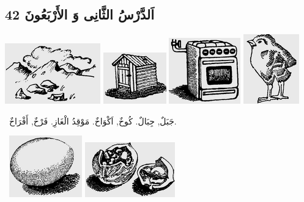 \documentclass[a5paper]{article}
\begin{document}
\subsection{اَلدَّرْسُ الثَّانِى وَ الأَرْبَعُونَ 42}
 \includegraphics[width=1.6252in,height=1.0311in]{MuhammadBagauddinlatinized-img125.png}   \includegraphics[width=1.0728in,height=0.8752in]{MuhammadBagauddinlatinized-img126.png}   \includegraphics[width=1.2189in,height=1.1252in]{MuhammadBagauddinlatinized-img127.png}   \includegraphics[width=0.948in,height=1.1874in]{MuhammadBagauddinlatinized-img128.png} 

\ جَبَلٌ, جِبَالٌ. كُوخٌ, اَكْوَاخٌ. مَوْقِدُ الْغَازِ. فَرْخٌ, أَفْرَاخٌ. 

\  \includegraphics[width=1.2398in,height=1.052in]{MuhammadBagauddinlatinized-img129.png}   \includegraphics[width=1.5311in,height=0.9374in]{MuhammadBagauddinlatinized-img130.png} 
\end{document}
